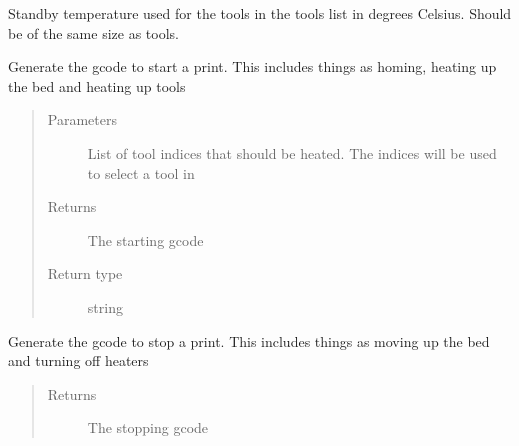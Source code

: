 \documentclass[letterpaper,10pt,english]{sphinxmanual}
\begin{document}
\begin{fulllineitems}
\begin{fulllineitems}
\label{\detokenize{index:generator.generator.standby_temperatures}}
\sphinxAtStartPar
Standby temperature used for the tools in the tools list in degrees Celsius. Should be of the same size as tools.

\end{fulllineitems}


\begin{fulllineitems}
\label{\detokenize{index:generator.generator.starting_code}}
\sphinxAtStartPar
Generate the gcode to start a print. This includes things as homing, heating up the bed and heating up tools
\begin{quote}\begin{description}
\item[{Parameters}] \leavevmode
\sphinxAtStartPar
{} \textendash{} List of tool indices that should be heated. The indices will be used to select a tool in {\hyperref[\detokenize{index:generator.generator.tools}]{}}

\item[{Returns}] \leavevmode
\sphinxAtStartPar
The starting gcode

\item[{Return type}] \leavevmode
\sphinxAtStartPar
string

\end{description}\end{quote}

\end{fulllineitems}


\begin{fulllineitems}
\label{\detokenize{index:generator.generator.stop_code}}
\sphinxAtStartPar
Generate the gcode to stop a print. This includes things as moving up the bed and turning off heaters
\begin{quote}\begin{description}
\item[{Returns}] \leavevmode
\sphinxAtStartPar
The stopping gcode


\end{description}
\end{quote}
\end{fulllineitems}
\end{fulllineitems}
\end{document}
